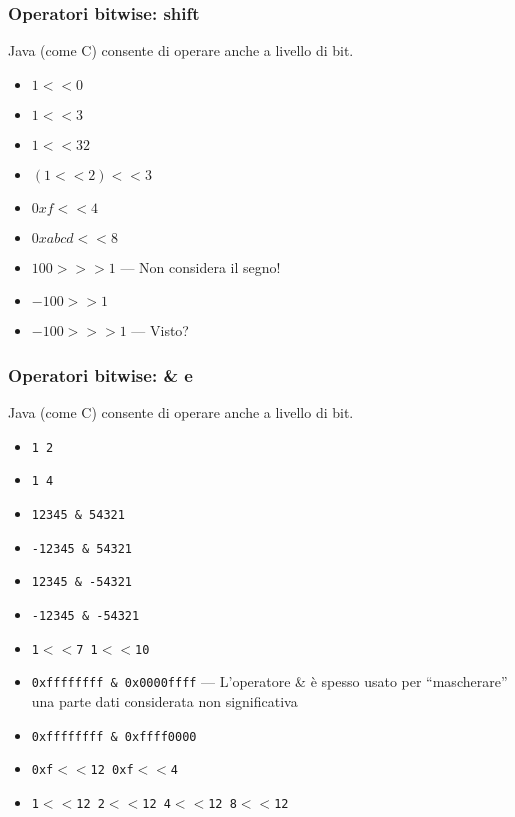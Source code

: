\documentclass{beamer}
\begin{document}
\begin{frame}
\frametitle{Operatori bitwise: shift}
Java (come C) consente di operare anche a livello di bit. %
\begin{itemize}
 \item \texttt{$1<<0$} 
 \item \texttt{$1<<3$} 
 \item \texttt{$1<<32$} 
 \item \texttt{$(1<<2)<<3$} 
 \item \texttt{$0xf << 4$} 
 \item \texttt{$0xabcd << 8$} 
 \item \texttt{$100 >>> 1$} --- Non considera il segno!
 \item \texttt{$-100 >> 1$} 
 \item \texttt{$-100 >>> 1$} --- Visto?
\end{itemize}
\end{frame}

\begin{frame}
\frametitle{Operatori bitwise: \& e \textbar{}}
Java (come C) consente di operare anche a livello di bit.%
\begin{itemize}
 \item \texttt{1 \textbar{} 2} 
 \item \texttt{1 \textbar{} 4} 
 \item \texttt{12345 \& 54321} 
 \item \texttt{-12345 \& 54321} 
 \item \texttt{12345 \& -54321} 
 \item \texttt{-12345 \& -54321} 
 \item \texttt{1$<<$7 \textbar{} 1$<<$10 } 
 \item \texttt{0xffffffff \& 0x0000ffff} --- L'operatore \& è spesso usato per ``mascherare'' una parte dati considerata non significativa
 \item \texttt{0xffffffff \& 0xffff0000} 
 \item \texttt{0xf$<<$12 \textbar{} 0xf$<<$4} 
 \item \texttt{1$<<$12 \textbar{} 2$<<$12 \textbar{} 4$<<$12 \textbar{} 8$<<$12} 
\end{itemize}
\end{frame}
\end{document}
